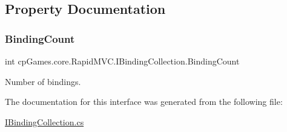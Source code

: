 \subsection{Property Documentation}
\mbox{\label{interfacecp_games_1_1core_1_1_rapid_m_v_c_1_1_i_binding_collection_ae64df704d272c94fcb9fb16e896bc66b}} 
\subsubsection{\texorpdfstring{BindingCount}{BindingCount}}
{\footnotesize\ttfamily int cp\+Games.\+core.\+Rapid\+M\+V\+C.\+I\+Binding\+Collection.\+Binding\+Count\hspace{0.3cm}{\ttfamily [get]}}



Number of bindings. 



The documentation for this interface was generated from the following file\+:\begin{DoxyCompactItemize}
\item 
\mbox{\hyperlink{_i_binding_collection_8cs}{I\+Binding\+Collection.\+cs}}\end{DoxyCompactItemize}
